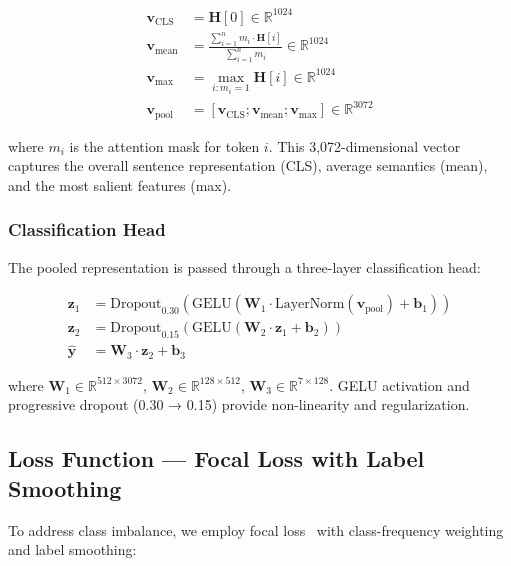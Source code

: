 \documentclass[conference, 10pt]{IEEEtran}
\begin{document}
\begin{align}
    \mathbf{v}_{\text{CLS}} &= \mathbf{H}[0] \in \mathbb{R}^{1024} \label{eq:cls} \\
    \mathbf{v}_{\text{mean}} &= \frac{\sum_{i=1}^{n} m_i \cdot \mathbf{H}[i]}{\sum_{i=1}^{n} m_i} \in \mathbb{R}^{1024} \label{eq:mean} \\
    \mathbf{v}_{\text{max}} &= \max_{i: m_i = 1} \mathbf{H}[i] \in \mathbb{R}^{1024} \label{eq:max} \\
    \mathbf{v}_{\text{pool}} &= [\mathbf{v}_{\text{CLS}}; \mathbf{v}_{\text{mean}}; \mathbf{v}_{\text{max}}] \in \mathbb{R}^{3072} \label{eq:concat}
\end{align}

where $m_i$ is the attention mask for token $i$. This 3,072-dimensional vector captures the overall sentence representation (CLS), average semantics (mean), and the most salient features (max).

\subsubsection{Classification Head}

The pooled representation is passed through a three-layer classification head:

\begin{equation}
\begin{aligned}
    \mathbf{z}_1 &= \text{Dropout}_{0.30}(\text{GELU}(\mathbf{W}_1 \cdot \text{LayerNorm}(\mathbf{v}_{\text{pool}}) + \mathbf{b}_1)) \\
    \mathbf{z}_2 &= \text{Dropout}_{0.15}(\text{GELU}(\mathbf{W}_2 \cdot \mathbf{z}_1 + \mathbf{b}_2)) \\
    \hat{\mathbf{y}} &= \mathbf{W}_3 \cdot \mathbf{z}_2 + \mathbf{b}_3
\end{aligned}
\end{equation}

where $\mathbf{W}_1 \in \mathbb{R}^{512 \times 3072}$, $\mathbf{W}_2 \in \mathbb{R}^{128 \times 512}$, $\mathbf{W}_3 \in \mathbb{R}^{7 \times 128}$. GELU activation and progressive dropout (0.30 → 0.15) provide non-linearity and regularization.

\subsection{Loss Function — Focal Loss with Label Smoothing}

To address class imbalance, we employ focal loss~\cite{lin2017focal} with class-frequency weighting and label smoothing:
\end{document}

